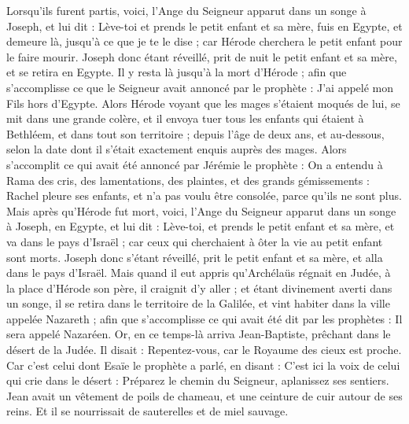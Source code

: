 \begin{multicols}{2}
Lorsqu’ils furent partis, voici, l’Ange du Seigneur apparut dans un songe à Joseph, et lui dit : Lève-toi et prends le petit enfant et sa mère, fuis en Egypte, et demeure là, jusqu'à ce que je te le dise ; car Hérode cherchera le petit enfant pour le faire mourir.
Joseph donc étant réveillé, prit de nuit le petit enfant et sa mère, et se retira en Egypte.
Il y resta là jusqu’à la mort d'Hérode ; afin que s’accomplisse ce que le Seigneur avait annoncé par le prophète : J'ai appelé mon Fils hors d'Egypte{}.
Alors Hérode voyant que les mages s'étaient moqués de lui, se mit dans une grande colère, et il envoya tuer tous les enfants qui étaient à Bethléem, et dans tout son territoire ; depuis l'âge de deux ans, et au-dessous, selon la date dont il s'était exactement enquis auprès des mages.
Alors s’accomplit ce qui avait été annoncé par Jérémie le prophète :
On a entendu à Rama des cris, des lamentations, des plaintes, et des grands gémissements : Rachel pleure ses enfants, et n’a pas voulu être consolée, parce qu’ils ne sont plus{}.
Mais après qu'Hérode fut mort, voici, l'Ange du Seigneur apparut dans un songe à Joseph, en Egypte,
et lui dit : Lève-toi, et prends le petit enfant et sa mère, et va dans le pays d'Israël ; car ceux qui cherchaient à ôter la vie au petit enfant sont morts.
Joseph donc s'étant réveillé, prit le petit enfant et sa mère, et alla dans le pays d'Israël.
Mais quand il eut appris qu'Archélaüs régnait en Judée, à la place d'Hérode son père, il craignit d'y aller ; et étant divinement averti dans un songe, il se retira dans le territoire de la Galilée,
et vint habiter dans la ville appelée Nazareth ; afin que s’accomplisse ce qui avait été dit par les prophètes : Il sera appelé Nazaréen{}.
\VerseOne{}Or, en ce temps-là arriva Jean-Baptiste, prêchant dans le désert de la Judée.
Il disait : Repentez-vous, car le Royaume des cieux est proche.
Car c'est celui dont Esaïe le prophète a parlé, en disant : C’est ici la voix de celui qui crie dans le désert : Préparez le chemin du Seigneur, aplanissez ses sentiers.
Jean avait un vêtement de poils de chameau, et une ceinture de cuir autour de ses reins. Et il se nourrissait de sauterelles et de miel sauvage.

\end{multicols}
